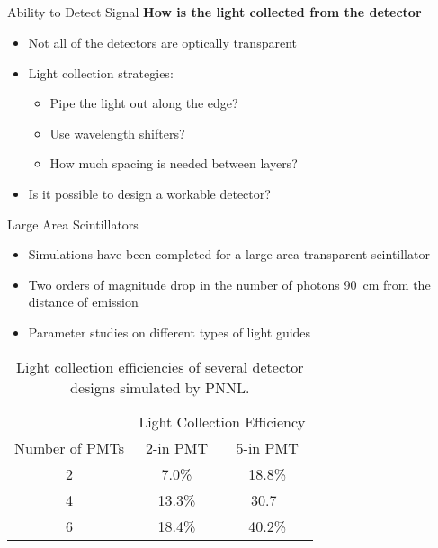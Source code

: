 \subsection*{}
\begin{frame}{Ability to Detect Signal}
  \textbf{How is the light collected from the detector}
  \vspace{1cm}
  \begin{itemize}
    \item Not all of the detectors are optically transparent
    \item Light collection strategies:
    \begin{itemize}
      \item Pipe the light out along the edge?
      \item Use wavelength shifters?
      \item How much spacing is needed between layers?
    \end{itemize}
    \item Is it possible to design a workable detector?
  \end{itemize}
\end{frame}
\begin{frame}[fragile]{Large Area Scintillators}
\begin{itemize}
  \item Simulations have been completed for a large area transparent scintillator
  \item Two orders of magnitude drop in the number of photons \SI{90}{\cm} from the distance of emission\cite{riggi_introducing_2011}
  \item Parameter studies on different types of light guides
\end{itemize}
\begin{table}
  \small
  \centering
  \caption[PNNL Light Collection Efficiencies]{Light collection efficiencies of several detector designs simulated by PNNL\cite{pnnl_14283}.}
  \label{tab:PNNLLightCollectionEfficiency}
  \begin{tabular}{c|c c}
  \toprule
  & \multicolumn{2}{c}{Light Collection Efficiency} \\
  Number of PMTs  & 2-in PMT & 5-in PMT \\
  \midrule
  2 & 7.0\% & 18.8\% \\
  4 & 13.3\% & 30.7\ \\
  6 & 18.4\% & 40.2\% \\
  \bottomrule
  \end{tabular}
\end{table}
\end{frame}
